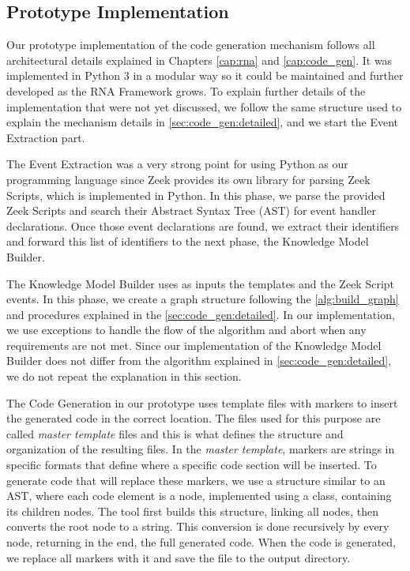 \subsection{Prototype Implementation}

Our prototype implementation of the code generation mechanism follows all architectural details explained in Chapters \ref{cap:rna} and \ref{cap:code_gen}. It was implemented in Python 3 in a modular way so it could be maintained and further developed as the RNA Framework grows. To explain further details of the implementation that were not yet discussed, we follow the same structure used to explain the mechanism details in \autoref{sec:code_gen:detailed}, and we start the Event Extraction part.

The Event Extraction was a very strong point for using Python as our programming language since Zeek provides its own library for parsing Zeek Scripts, which is implemented in Python. In this phase, we parse the provided Zeek Scripts and search their Abstract Syntax Tree (AST) for event handler declarations. Once those event declarations are found, we extract their identifiers and forward this list of identifiers to the next phase, the Knowledge Model Builder.

The Knowledge Model Builder uses as inputs the templates and the Zeek Script events. In this phase, we create a graph structure following the \autoref{alg:build_graph} and procedures explained in the \autoref{sec:code_gen:detailed}. In our implementation, we use exceptions to handle the flow of the algorithm and abort when any requirements are not met. Since our implementation of the Knowledge Model Builder does not differ from the algorithm explained in \autoref{sec:code_gen:detailed}, we do not repeat the explanation in this section.

The Code Generation in our prototype uses template files with markers to insert the generated code in the correct location. The files used for this purpose are called \textit{master template} files and this is what defines the structure and organization of the resulting files. In the \textit{master template}, markers are strings in specific formats that define where a specific code section will be inserted. To generate code that will replace these markers, we use a structure similar to an AST, where each code element is a node, implemented using a class, containing its children nodes. The tool first builds this structure, linking all nodes, then converts the root node to a string. This conversion is done recursively by every node, returning in the end, the full generated code. When the code is generated, we replace all markers with it and save the file to the output directory.

